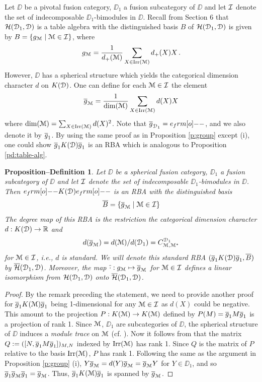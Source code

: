 \documentclass{amsart}
\newtheorem{propdef}[thm]{Proposition--Definition}
\begin{document}
Let $\DD$ be a pivotal fusion category,  $\DD_1$ a fusion subcategory of $\DD$  and let ${\mathcal{I}}$ denote the set of indecomposable $\DD_1$-bimodules in $\DD$. Recall from Section 6 that ${\mathcal{H}({\EuScript{D}}_1, {\EuScript{D}})}$ is a table algebra with the distinguished basis $B$ of   ${\mathcal{H}({\EuScript{D}}_1, {\EuScript{D}})}$ is given by 
$B=\{{g_{\EuScript{M}}} \mid {\EuScript{M}} \in {\mathcal{I}}\}$, where 
$$
{g_{\EuScript{M}}} = \frac{1}{d_+({\EuScript{M}})}\sum_{X \in \operatorname{Irr}({\EuScript{M}})} d_+(X) X\,.
$$
However, $\DD$ has a spherical structure which yields the categorical dimension character $d$ on ${K({\EuScript{D}})}$. One can define for each ${\EuScript{M}} \in {\mathcal{I}}$ the element
$$
{\overline{g}_{\EuScript{M}}} = \frac{1}{\dim({\EuScript{M}})}\sum_{X \in \operatorname{Irr}({\EuScript{M}})} d(X) X
$$
where $\dim({\EuScript{M}}) = \sum_{X \in \operatorname{Irr}({\EuScript{M}})} d(X)^2$. Note that $\ol g_{\DD_1} = e_\1$, and we also denote it by ${\overline{g}}_1$. By using the same proof as in Proposition \ref{p:group} except (i), one could show ${\overline{g}}_1 {K({\EuScript{D}})} {\overline{g}}_1$ is an RBA which is analogous to Proposition \ref{pd:table-alg}.
\begin{propdef} \label{d:RBA} Let $\DD$ be a spherical fusion category,  $\DD_1$ a fusion subcategory of $\DD$  and let ${\mathcal{I}}$ denote the set of indecomposable $\DD_1$-bimodules in $\DD$. Then $e_\1 \KD e_\1$ is an RBA with the distinguished basis 
$$
\overline B=\{{\overline{g}_{\EuScript{M}}} \mid {\EuScript{M}} \in {\mathcal{I}}\}
$$
The degree map of this RBA is the restriction the categorical dimension character $d: {K({\EuScript{D}})} \to \mathbb{R}$ and 
$$
d({\overline{g}_{\EuScript{M}}})=d({\EuScript{M}})/d({\EuScript{D}}_1) = C_{{\EuScript{M}}, {\EuScript{M}}^*}^{{\EuScript{D}}_1}  
$$
for ${\EuScript{M}} \in {\mathcal{I}}$, i.e., $d$ is standard. We will denote this standard RBA $({\overline{g}}_1 {K({\EuScript{D}})} {\overline{g}}_1, \overline{B})$ by ${\overline{\mathcal{H}}({\EuScript{D}}_1, {\EuScript{D}})}$. Moreover, the map $\overline {\cdot} : {g_{\EuScript{M}}}  \mapsto {\overline{g}_{\EuScript{M}}}$ for ${\EuScript{M}} \in {\mathcal{I}}$ defines a linear isomorphism from ${\mathcal{H}({\EuScript{D}}_1, {\EuScript{D}})}$ onto ${\overline{\mathcal{H}}({\EuScript{D}}_1, {\EuScript{D}})}$.
\end{propdef} 
\begin{proof}
By the remark preceding the statement, we need to provide another proof for ${\overline{g}}_1 {K({\EuScript{M}})} {\overline{g}}_1$ being 1-dimensional for any ${\EuScript{M}} \in {\mathcal{I}}$ as $d(X)$ could be negative. This amount to the projection $P: {K({\EuScript{M}})} \to {K({\EuScript{M}})}$ defined by $P(M) = {\overline{g}}_1 M {\overline{g}}_1$ is a projection of rank 1. Since ${\EuScript{M}}$, $\DD_1$ are subcategories of $\DD$, the spherical structure of $\DD$ induces a \emph{module trace} on ${\EuScript{M}}$ (cf. \cite[Defn. 3.7]{Schau}). Now it follows from \cite[Props. 5.6 and 5.7]{Schau} that the matrix $Q:=([N, {\overline{g}}_1 M{\overline{g}}_1])_{M,N}$ indexed by $\operatorname{Irr}({\EuScript{M}})$ has rank 1. Since $Q$ is the matrix of $P$ relative to the basis $\operatorname{Irr}({\EuScript{M}})$, $P$ has rank 1. Following the same as the argument in Proposition \ref{p:group} (i), $Y{\overline{g}_{\EuScript{M}}} = d(Y) {\overline{g}_{\EuScript{M}}} = {\overline{g}_{\EuScript{M}}} Y$ for $Y \in \DD_1$, and so ${\overline{g}}_1 {\overline{g}_{\EuScript{M}}} {\overline{g}}_1= {\overline{g}_{\EuScript{M}}}$. Thus, ${\overline{g}}_1 {K({\EuScript{M}})} {\overline{g}}_1$ is spanned by ${\overline{g}_{\EuScript{M}}}$. 
\end{proof}
\end{document}
